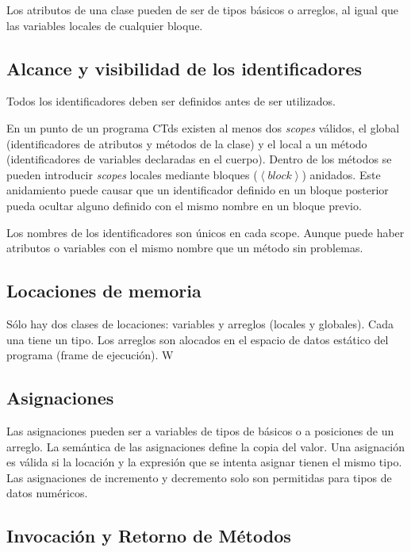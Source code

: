 \documentclass[11pt,a4paper]{article}
\begin{document}
Los atributos de una clase pueden de ser de tipos básicos o arreglos, al igual que las variables locales de cualquier bloque.

\subsection{Alcance y visibilidad de los identificadores}
\label{identificadores}

Todos los identificadores deben ser definidos antes de ser utilizados. 

En un punto de un programa CTds existen al menos dos \textit{scopes} válidos, el global (identificadores de atributos y métodos de la clase) y el local a un método (identificadores de variables declaradas en el cuerpo). Dentro de los métodos se pueden introducir \textit{scopes} locales mediante bloques ($\left\langle block \right\rangle$) anidados. Este anidamiento puede causar que un identificador definido en un bloque posterior pueda ocultar alguno definido con el mismo nombre en un bloque previo.

Los nombres de los identificadores son únicos en cada scope. Aunque puede haber atributos o variables con el mismo nombre que un método sin problemas.

\subsection{Locaciones de memoria}
\label{locaciones}

Sólo hay dos clases de locaciones: variables y arreglos (locales y globales). Cada una tiene un tipo. Los arreglos son alocados en el espacio de datos estático del programa (frame de ejecución). 
W
\subsection{Asignaciones}
\label{asignaciones}

Las asignaciones pueden ser a variables de tipos de básicos o a posiciones de un arreglo. La semántica de las asignaciones define la copia del valor. Una asignación es válida si la locación y la expresión que se intenta asignar tienen el mismo tipo. Las asignaciones de incremento y decremento solo son permitidas para tipos de datos numéricos.

\subsection{Invocación y Retorno de Métodos}
\label{metodos}
\end{document}

